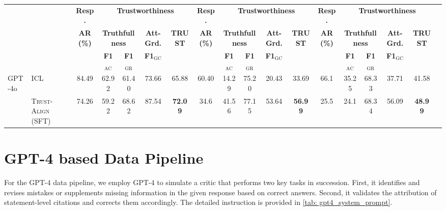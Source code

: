 \documentclass{article} %
\newcommand{\method}[0]{\textsc{Trust-Align}}
\begin{document}
\begin{table}[htb!]
{\begin{tabular}{ll*{16}{c}}
& & \multicolumn{1}{c}{\textbf{Resp.}} & \multicolumn{4}{c}{\textbf{Trustworthiness}} & \multicolumn{1}{c}{\textbf{Resp.}} & \multicolumn{4}{c}{\textbf{Trustworthiness}} & \multicolumn{1}{c}{\textbf{Resp.}} & \multicolumn{4}{c}{\textbf{Trustworthiness}} \\
\cmidrule(lr){3-3}\cmidrule(lr){4-7}\cmidrule(lr){8-8}\cmidrule(lr){9-12}\cmidrule(lr){13-13}\cmidrule(lr){14-17}
& & \multirow{2}{*}{\textbf{AR (\%)}} & \multicolumn{2}{c}{\textbf{Truthfullness}} & \textbf{Att-Grd.} & \multirow{2}{*}{\textbf{TRUST}} & \multirow{2}{*}{\textbf{AR (\%)}} & \multicolumn{2}{c}{\textbf{Truthfullness}} & \textbf{Att-Grd.} & \multirow{2}{*}{\textbf{TRUST}} & \multirow{2}{*}{\textbf{AR (\%)}} & \multicolumn{2}{c}{\textbf{Truthfullness}} & \textbf{Att-Grd.} & \multirow{2}{*}{\textbf{TRUST}} \\
\cmidrule(lr){4-5}\cmidrule(lr){6-6}\cmidrule(lr){9-10}\cmidrule(lr){11-11}\cmidrule(lr){14-15}\cmidrule(lr){16-16}
& & & \textbf{F1$_{\text{AC}}$} & \textbf{F1$_{\text{GR}}$} & \textbf{F1$_{\text{GC}}$} & \textbf{} & & \textbf{F1$_{\text{AC}}$} & \textbf{F1$_{\text{GR}}$} & \textbf{F1$_{\text{GC}}$} & \textbf{} & & \textbf{F1$_{\text{AC}}$} & \textbf{F1$_{\text{GR}}$} & \textbf{F1$_{\text{GC}}$} & \textbf{} \\
\midrule
\multirow{2}{*}{GPT-4o} 
& ICL & 84.49 & 62.92 & 61.40 & 73.66 & 65.88 & 60.40	& 14.29 & 75.20 & 20.43 & 33.69 & 66.1 & 35.25 & 68.33	& 37.71 & 41.58 \\
& \method{} (SFT) & 74.26	& 59.22	& 68.62	& 87.54	& \textbf{72.09} & 34.6	& 41.56	& 77.15	& 53.64	&\textbf{ 56.99} & 25.5	& 24.1	& 68.34	& 56.09	& \textbf{48.99}  \\
\bottomrule
\end{tabular}
}
\end{table}

\section{GPT-4 based Data Pipeline} \label{app: gpt4_pipeline}
For the GPT-4 data pipeline, we employ GPT-4 to simulate a critic that performs two key tasks in succession. First, it identifies and revises mistakes or supplements missing information in the given response based on correct answers. Second, it validates the attribution of statement-level citations and corrects them accordingly. The detailed instruction is provided in \cref{tab: gpt4_system_prompt}.
\end{document}
